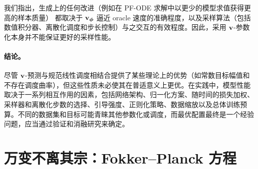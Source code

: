 我们指出，生成上的任何改进（例如在 PF-ODE 求解中以更少的模型求值获得更高的样本质量）
都取决于 ${\mathbf{v}}_{{\bm{\phi}}}$ 逼近 oracle 速度的准确程度，以及采样算法（包括数值积分器、离散化调度和步长控制）与之交互的有效程度。因此，采用 ${\mathbf{v}}$-参数化本身并不能保证更好的采样性能。




\paragraph{结论。}
尽管 ${\mathbf{v}}$-预测与规范线性调度相结合提供了某些理论上的优势（如常数目标幅值和不存在调度曲率），但这些性质未必使其在普适意义上更优。在实践中，模型性能取决于一系列相互作用的因素，包括网络架构、归一化方案、随时间的损失加权、采样器和离散化步数的选择、引导强度、正则化策略、数据缩放以及总体训练预算。不同的数据集和目标可能青睐其他参数化或调度，而最优配置最终是一个经验问题，应当通过验证和消融研究来确定。



\clearpage
\newpage



\section{万变不离其宗：Fokker–Planck 方程}\label{sec:comparison-connection}


